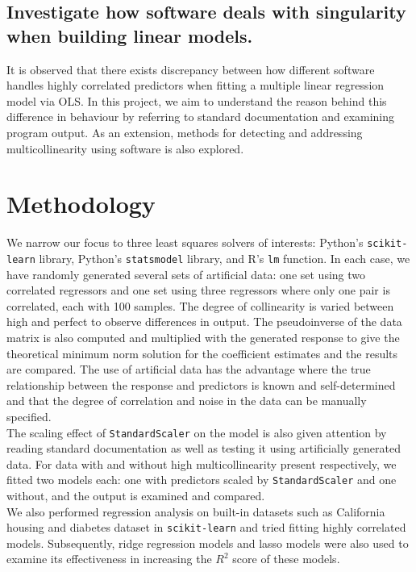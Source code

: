 \documentclass[12pt]{article}
\begin{document}
	
	\subsection{Investigate how software deals with singularity when building linear models.}
	
	It is observed that there exists discrepancy between how different software handles highly correlated predictors when fitting a multiple linear regression model via OLS. In this project, we aim to understand the reason behind this difference in behaviour by referring to standard documentation and examining program output. As an extension, methods for detecting and addressing multicollinearity using software is also explored.
	
	\section{Methodology}
	
	We narrow our focus to three least squares solvers of interests: Python's \texttt{scikit-learn} library, Python's \texttt{statsmodel} library, and R's \texttt{lm} function. In each case, we have randomly generated several sets of artificial data: one set using two correlated regressors and one set using three regressors where only one pair is correlated, each with 100 samples. The degree of collinearity is varied between high and perfect to observe differences in output. The pseudoinverse of the data matrix is also computed and multiplied with the generated response to give the theoretical minimum norm solution for the coefficient estimates and the results are compared. The use of artificial data has the advantage where the true relationship between the response and predictors is known and self-determined and that the degree of correlation and noise in the data can be manually specified.\\
	
	The scaling effect of \texttt{StandardScaler} on the model is also given attention by reading standard documentation as well as testing it using artificially generated data. For data with and without high multicollinearity present respectively, we fitted two models each: one with predictors scaled by \texttt{StandardScaler} and one without, and the output is examined and compared. \\
	
	We also performed regression analysis on built-in datasets such as California housing and diabetes dataset in \texttt{scikit-learn} and tried fitting highly correlated models. Subsequently, ridge regression models and lasso models were also used to examine its effectiveness in increasing the $R^2$ score of these models.
	
\end{document}
